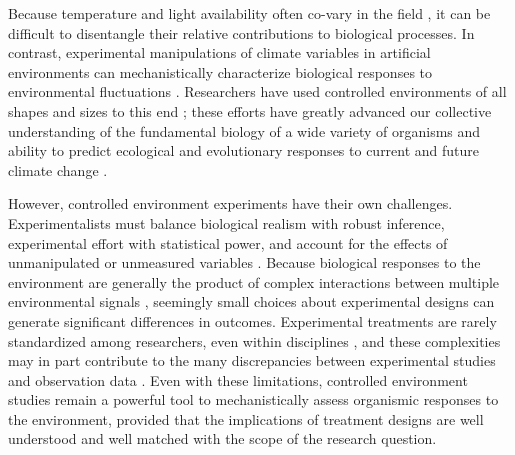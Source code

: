 \documentclass[11pt]{article}
\begin{document}
\noindent Because temperature and light availability often co-vary in the field \citep[for example, in most temperate ecosystems, daylength and temperature both increase as the season progresses,][]{Rosenberg1974}, it can be difficult to disentangle their relative contributions to biological processes. In contrast, experimental manipulations of climate variables in artificial environments can mechanistically characterize biological responses to environmental fluctuations \citep{Ettinger:2020aa,Primack2015}. Researchers have used controlled environments of all shapes and sizes to this end \citep{Downs:1980us}; these efforts have greatly advanced our collective understanding of the fundamental biology of a wide variety of organisms and ability to predict ecological and evolutionary responses to current and future climate change \citep{Stewart:2013wz}.

However, controlled environment experiments have their own challenges. Experimentalists must balance biological realism with robust inference, experimental effort with statistical power, and account for the effects of unmanipulated or unmeasured variables \citep{schneiner2001}. Because biological responses to the environment are generally the product of complex interactions between multiple environmental signals \citep{Casal:2002vz}, seemingly small choices about experimental designs can generate significant differences in outcomes. Experimental treatments are rarely standardized among researchers, even within disciplines \citep{Wolkovich_2022}, and these complexities may in part contribute to the many discrepancies between experimental studies and observation data \citep{Poorter:2016aa}. Even with these limitations, controlled environment studies remain a powerful tool to mechanistically assess organismic responses to the environment, provided that the implications of treatment designs are well understood and well matched with the scope of the research question. 
\end{document}
